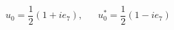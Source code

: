 \begin{equation}                      
u_{0} = \frac{1}{2} (1 +i e_{7}) ,                      
~~~~~~~u_{0}^{*} = \frac{1}{2} (1 -i e_{7})                       
\end{equation} 
